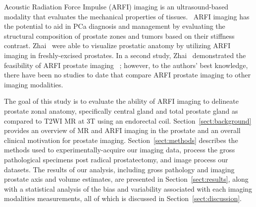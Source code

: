 Acoustic Radiation Force Impulse (ARFI) imaging is an ultrasound-based modality
that evaluates the mechanical properties of tissues.~\cite{Nightingale2002b}
ARFI imaging has the potential to aid in PCa diagnosis and management by
evaluating the structural composition of prostate zones and tumors based on
their stiffness contrast.  Zhai \etal~were able to visualize prostatic anatomy
by utilizing ARFI imaging in freshly-excised prostates. In a second study, Zhai
\etal~demonstrated the feasibility of ARFI prostate imaging
\invivo~\cite{Zhai2012}; however, to the authors’ best knowledge, there have
been no studies to date that compare \invivo ARFI prostate imaging to other
imaging modalities.~\cite{Zhai2010} 

The goal of this study is to evaluate the ability of ARFI imaging to delineate
prostate zonal anatomy, specifically central gland and total prostate gland
\invivo as compared to T2WI MR at 3T using an endorectal coil.
Section~\ref{sect:background} provides an overview of MR and ARFI imaging in
the prostate and an overall clinical motivation for prostate imaging.
Section~\ref{sect:methods} describes the methods used to experimentally-acquire
our imaging data, process the gross pathological specimens post radical
prostatectomy, and image process our datasets.  The results of our analysis,
including gross pathology and imaging prostate axis and volume estimates, are
presented in Section~\ref{sect:results}, along with a statistical analysis of
the bias and variability associated with each imaging modalities measurements,
all of which is discussed in Section~\ref{sect:discussion}.
